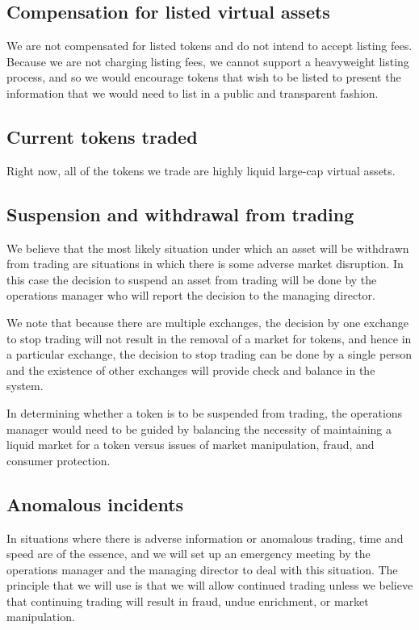 \subsection{Compensation for listed virtual assets}

We are not compensated for listed tokens and do not intend to accept
listing fees.  Because we are not charging listing fees, we cannot
support a heavyweight listing process, and so we would encourage
tokens that wish to be listed to present the information that we would
need to list in a public and transparent fashion.

\subsection{Current tokens traded}
Right now, all of the tokens we trade are highly liquid large-cap
virtual assets.


\subsection{Suspension and withdrawal from trading}
We believe that the most likely situation under which an asset will be
withdrawn from trading are situations in which there is some adverse
market disruption.  In this case the decision to suspend an asset from
trading will be done by the operations manager who will report the
decision to the managing director.

We note that because there are multiple exchanges, the decision by one
exchange to stop trading will not result in the removal of a market
for tokens, and hence in a particular exchange, the decision to stop
trading can be done by a single person and the existence of other
exchanges will provide check and balance in the system.

In determining whether a token is to be suspended from trading, the
operations manager would need to be guided by balancing the necessity
of maintaining a liquid market for a token versus issues of market
manipulation, fraud, and consumer protection.


\subsection{Anomalous incidents}
In situations where there is adverse information or anomalous trading,
time and speed are of the essence, and we will set up an emergency
meeting by the operations manager and the managing director to deal
with this situation.  The principle that we will use is that we will
allow continued trading unless we believe that continuing trading will
result in fraud, undue enrichment, or market manipulation.

